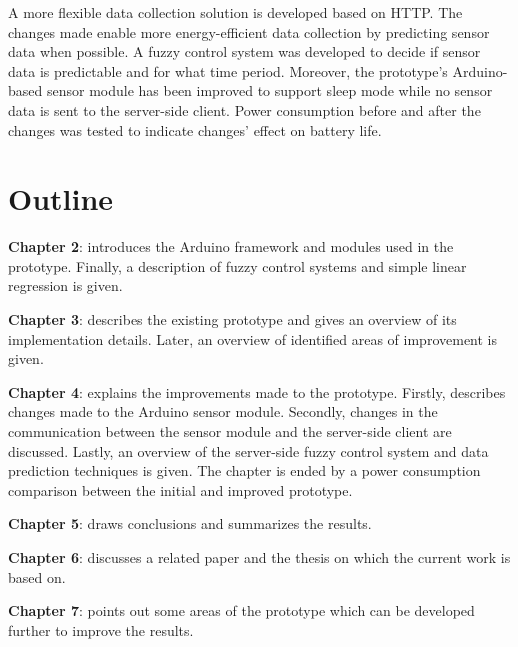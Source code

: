 A more flexible data collection solution is developed based on HTTP. The changes made enable more energy-efficient data collection by predicting sensor data when possible. A fuzzy control system was developed to decide if sensor data is predictable and for what time period.  Moreover, the prototype's Arduino-based sensor module has been improved to support sleep mode while no sensor data is sent to the server-side client. Power consumption before and after the changes was tested to indicate changes' effect on battery life. 

\section{Outline}


\noindent \textbf{Chapter 2}: introduces the Arduino framework and modules used in the prototype. Finally, a description of fuzzy control systems and simple linear regression is given.
\newline

\noindent \textbf{Chapter 3}: describes the existing prototype and gives an overview of its implementation details. Later, an overview of identified areas of improvement is given.
\newline

\noindent \textbf{Chapter 4}: explains the improvements made to the prototype. Firstly, describes changes made to the Arduino sensor module. Secondly, changes in the communication between the sensor module and the server-side client are discussed. Lastly, an overview of the server-side fuzzy control system and data prediction techniques is given. The chapter is ended by a power consumption comparison between the initial and improved prototype.
\newline

\noindent \textbf{Chapter 5}: draws conclusions and summarizes the results.
\newline

\noindent \textbf{Chapter 6}: discusses a related paper and the thesis on which the current work is based on.
\newline

\noindent \textbf{Chapter 7}: points out some areas of the prototype which can be developed further to improve the results.
\newline




